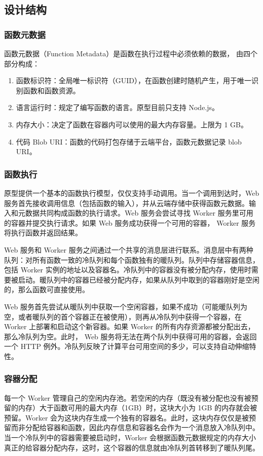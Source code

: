 \documentclass[11pt]{article}
\begin{document}
\subsection{设计结构}
\subsubsection{函数元数据}
函数元数据（Function Metadata）是函数在执行过程中必须依赖的数据， 由四个部分构成：
\begin{enumerate}
	\item 函数标识符：全局唯一标识符（GUID），在函数创建时随机产生，用于唯一识别函数和函数资源。
	\item 语言运行时：规定了编写函数的语言。原型目前只支持 Node.js。
	\item 内存大小：决定了函数在容器内可以使用的最大内存容量。上限为 1 GB。
	\item 代码 Blob URI：函数的代码打包存储于云端平台，函数元数据记录 blob URI。
\end{enumerate}

\subsubsection{函数执行}
原型提供一个基本的函数执行模型，仅仅支持手动调用。当一个调用到达时，Web 服务首先接收调用信息（包括函数的输入），并从云端存储中获得函数元数据。输入和元数据共同构成函数的执行请求。Web 服务会尝试寻找 Worker 服务里可用的容器并提交执行请求。如果 Web 服务成功获得一个可用的容器， Worker 服务将执行函数并返回结果。


Web 服务和 Worker 服务之间通过一个共享的消息层进行联系。消息层中有两种队列：对所有函数一致的冷队列和每个函数独有的暖队列。队列中存储容器信息，包括 Worker 实例的地址以及容器名。冷队列中的容器没有被分配内存，使用时需要被启动。暖队列中的容器已经被分配内存，如果从队列中取到的容器刚好是空闲的，那么函数可直接使用。


Web 服务首先尝试从暖队列中获取一个空闲容器，如果不成功（可能暖队列为空，或者暖队列的首个容器正在被使用），则再从冷队列中获得一个容器，在 Worker 上部署和启动这个新容器。如果 Worker 的所有内存资源都被分配出去，那么冷队列为空。此时， Web 服务将无法在两个队列中获得可用的容器，会返回一个 HTTP 例外。冷队列反映了计算平台可用空间的多少，可以支持自动伸缩特性。

\subsubsection{容器分配}
每一个 Worker 管理自己的空闲内存池。若空闲的内存（既没有被分配也没有被预留的内存）大于函数可用的最大内存（1GB）时，这块大小为 1GB 的内存就会被预留。Worker 会为这块内存生成一个独有的容器名。此时，这块内存仅仅是被预留而非分配给容器和函数，因此内存信息和容器名会作为一个消息放入冷队列中。当一个冷队列中的容器需要被启动时，Worker 会根据函数元数据规定的内存大小真正的给容器分配内存，这时，这个容器的信息就由冷队列首转移到了暖队列尾。
\end{document}
